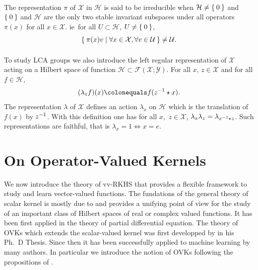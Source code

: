 \paragraph{}
The representation $\pi$ of $\mathcal{X}$ in $\mathcal{H}$ is said to be
irreducible when $\mathcal{H}\neq \Set{0}$ and $\Set{0}$ and $\mathcal{H}$ are
the only two stable invariant subspaces under all operators $\pi(x)$ for all
$x\in\mathcal{X}$. \acs{ie}~for all $ U\subset\mathcal{H}$, $U\neq \Set{0}$,
\begin{dmath*}
    \Set{\pi(x)v|\forall x\in\mathcal{X},\forall v\in\mathcal{U}}\neq
    \mathcal{U}.
\end{dmath*}
\paragraph{}
To study \ac{LCA} groups we also introduce the left regular representation of
$\mathcal{X}$ acting on a Hilbert space of function
$\mathcal{H}\subset\mathcal{F}(\mathcal{X};\mathcal{Y})$. For all $x$,
$z\in\mathcal{X}$ and for all $f\in\mathcal{H}$,
\begin{dmath*}
    (\lambda_z f)(x)\colonequals f(\inv{z}\groupop x).
\end{dmath*}
The representation $\lambda$ of $\mathcal{X}$ defines an action $\lambda_x$ on
$\mathcal{H}$ which is the translation of $f(x)$ by ${z}^{-1}$. With this
definition one has for all $x,$ $z\in\mathcal{X}$,
$\lambda_x\lambda_z=\lambda_{{x}^{-1}\star z}$. Such representations are
faithful, that is $\lambda_x=1 \iff x=e$.

\section{On Operator-Valued Kernels}
\label{sec:background_on_operator-valued_kernels} We now introduce the theory
of \acf{vv-RKHS} that provides a flexible framework to study and learn
vector-valued functions. The fundations of the general theory of scalar kernel
is mostly due to \citet{Aronszajn1950}  and provides a unifying point of view
for the study of an important class of Hilbert spaces of real or complex valued
functions. It has been first applied in the theory of partial differential
equation. The theory of \acfp{OVK} which extends the scalar-valued kernel was
first developped by \citet{Pedrick57} in his Ph.~D Thesis. Since then it has
been successfully applied to machine learning by many authors. In particular we
introduce the notion of \aclp{OVK} following the propositions of
\citet{Micchelli2005,carmeli2006vector,Carmeli2010}.

